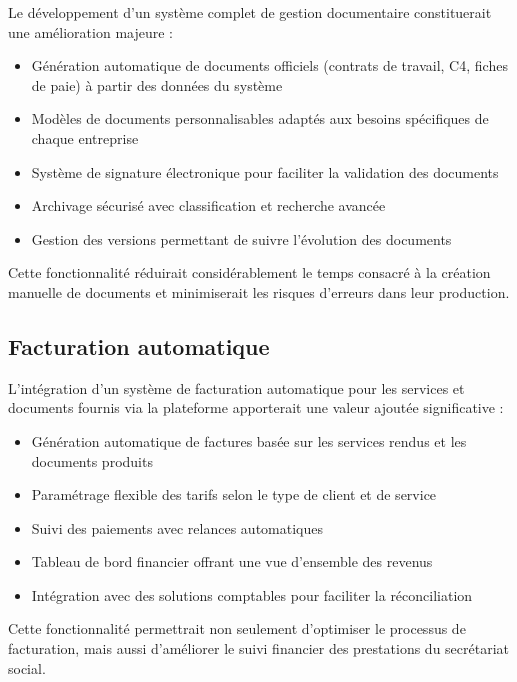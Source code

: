 Le développement d'un système complet de gestion documentaire constituerait une amélioration majeure :

\begin{itemize}
  \item Génération automatique de documents officiels (contrats de travail, C4, fiches de paie) à partir des données du système
  \item Modèles de documents personnalisables adaptés aux besoins spécifiques de chaque entreprise
  \item Système de signature électronique pour faciliter la validation des documents
  \item Archivage sécurisé avec classification et recherche avancée
  \item Gestion des versions permettant de suivre l'évolution des documents
\end{itemize}

Cette fonctionnalité réduirait considérablement le temps consacré à la création manuelle de documents et minimiserait les risques d'erreurs dans leur production.

\subsection*{Facturation automatique}

L'intégration d'un système de facturation automatique pour les services et documents fournis via la plateforme apporterait une valeur ajoutée significative :

\begin{itemize}
  \item Génération automatique de factures basée sur les services rendus et les documents produits
  \item Paramétrage flexible des tarifs selon le type de client et de service
  \item Suivi des paiements avec relances automatiques
  \item Tableau de bord financier offrant une vue d'ensemble des revenus
  \item Intégration avec des solutions comptables pour faciliter la réconciliation
\end{itemize}

Cette fonctionnalité permettrait non seulement d'optimiser le processus de facturation, mais aussi d'améliorer le suivi financier des prestations du secrétariat social.

